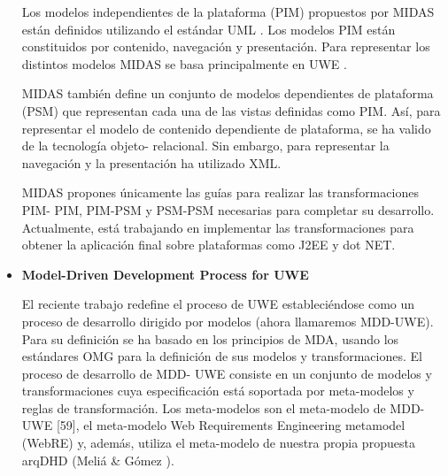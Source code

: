 \begin{itemize}
Los modelos independientes de la plataforma (PIM) propuestos por MIDAS están
definidos utilizando el estándar UML \cite{UML}. Los modelos PIM están constituidos
por contenido, navegación y presentación. Para representar los distintos modelos
MIDAS se basa principalmente en UWE \cite{UWE}.

MIDAS también define un conjunto de modelos dependientes de plataforma (PSM)
que representan cada una de las vistas definidas como PIM. Así, para representar
el modelo de contenido dependiente de plataforma, se ha valido de la tecnología
objeto- relacional. Sin embargo, para representar la navegación y la
presentación ha utilizado XML. 

MIDAS propones únicamente las guías para realizar las transformaciones PIM-
PIM, PIM-PSM y PSM-PSM necesarias para completar su desarrollo. Actualmente,
está trabajando en implementar las transformaciones para obtener la aplicación
final sobre plataformas como J2EE y dot NET.


\item \textbf{Model-Driven Development Process for UWE}

El reciente trabajo \cite{58} redefine el proceso de UWE estableciéndose como un
proceso de desarrollo dirigido por modelos (ahora llamaremos MDD-UWE). Para su
definición se ha basado en los principios de MDA, usando los estándares OMG para
la definición de sus modelos y transformaciones. El proceso de desarrollo de
MDD- UWE consiste en un conjunto de modelos y transformaciones cuya
especificación está soportada por meta-modelos y reglas de transformación. Los
meta-modelos son el meta-modelo de MDD-UWE [59], el meta-modelo Web Requirements
Engineering metamodel (WebRE) \cite{WebRE} y, además, utiliza el meta-modelo de nuestra
propia propuesta arqDHD (Meliá \& Gómez \cite{Melia}).

\end{itemize}
